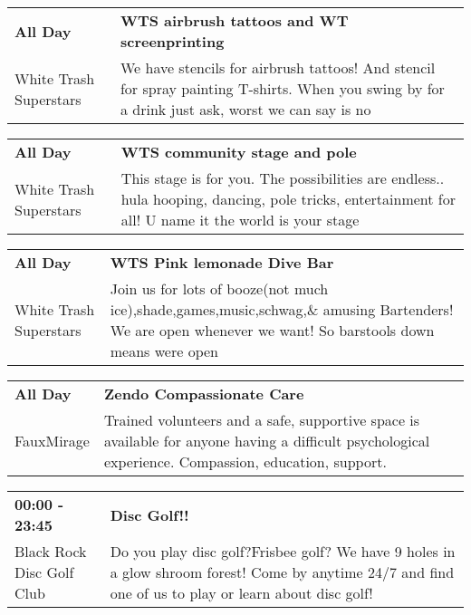 \begin{tabular}{ p{1in} p{2.2in} }
    \textbf{All Day} & \textbf{WTS airbrush tattoos and WT screenprinting} \\
    White Trash Superstars \newline  & We have stencils for airbrush tattoos! And stencil for spray painting T-shirts. When you swing by for a drink just ask, worst we can say is no \\
    \hline 
\end{tabular}
    
\begin{tabular}{ p{1in} p{2.2in} }
    \textbf{All Day} & \textbf{WTS community stage and pole} \\
    White Trash Superstars \newline  & This stage is for you. The possibilities are endless.. hula hooping,  dancing, pole tricks, entertainment for all! U name it the world is your stage \\
    \hline 
\end{tabular}
    
\begin{tabular}{ p{1in} p{2.2in} }
    \textbf{All Day} & \textbf{WTS Pink lemonade Dive Bar} \\
    White Trash Superstars \newline  & Join us for lots of booze(not much ice),shade,games,music,schwag,\& amusing Bartenders! We are open whenever we want! So barstools down means were open \\
    \hline 
\end{tabular}
    
\begin{tabular}{ p{1in} p{2.2in} }
    \textbf{All Day} & \textbf{Zendo Compassionate Care } \\
    FauxMirage \newline  & Trained volunteers and a safe, supportive space is available for anyone having a difficult psychological experience. Compassion, education, support. \\
    \hline 
\end{tabular}
    
\begin{tabular}{ p{1in} p{2.2in} }
    \textbf{00:00 - 23:45} & \textbf{Disc Golf!!} \\
    Black Rock Disc Golf Club \newline  & Do you play disc golf?Frisbee golf? We have 9 holes in a glow shroom forest! Come by anytime 24/7 and find one of us to play or learn about disc golf! \\
    \hline 
\end{tabular}
    
